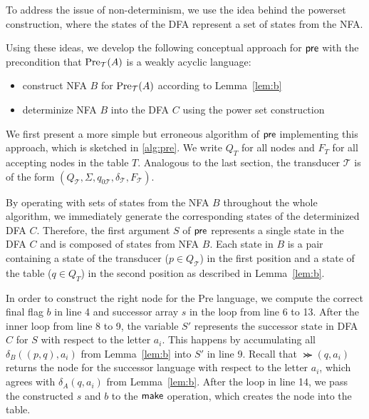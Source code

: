 \par

To address the issue of non-determinism, we use the idea behind the powerset construction, where the states of the DFA represent a set of states from the NFA. 

\par 

Using these ideas, we develop the following conceptual approach for $\operatorname{\textsf{pre}}$ with the precondition that $\operatorname{\text{Pre}}_{\mathcal{T}}(A)$ is a weakly acyclic language:
\begin{itemize}[-,noitemsep]
\item construct NFA $B$ for $\operatorname{\text{Pre}}_{\mathcal{T}}(A)$ according to Lemma~\ref{lem:b}
\item determinize NFA $B$ into the DFA $C$ using the power set construction
\end{itemize}

We first present a more simple but erroneous algorithm of $\operatorname{\textsf{pre}}$ implementing this approach, which is sketched in \autoref{alg:pre}. We write $Q_{T}$ for all nodes and $F_{T}$ for all accepting nodes in the table $T$. Analogous to the last section, the transducer $\mathcal{T}$ is of the form $(Q_{\mathcal{T}},\Sigma,q_{0\mathcal{T}},\delta_{\mathcal{T}},F_{\mathcal{T}})$.

By operating with sets of states from the NFA $B$ throughout the whole algorithm, we immediately generate the corresponding states of the determinized DFA $C$.
Therefore, the first argument $S$ of $\operatorname{\textsf{pre}}$ represents a single state in the DFA $C$ and is composed of states from NFA $B$.  
Each state in $B$ is a pair containing a state of the transducer ($ p \in Q_{\mathcal{T}}$) in the first position and a state of the table ($ q \in Q_{T}$) in the second position as described in Lemma~\autoref{lem:b}.

In order to construct the right node for the Pre language, we compute the correct final flag $b$ in line 4 and successor array $s$ in the loop from line 6 to 13. After the inner loop from line 8 to 9, the variable $S'$ represents the successor state in DFA $C$ for $S$ with respect to the letter $a_{i}$. This happens by accumulating all $\delta_{B}((p,q),a_{i})$ from Lemma~\autoref{lem:b} into $S'$ in line 9. Recall that $\Succ(q,a_{i})$ returns the node for the successor language with respect to the letter $a_{i}$, which agrees with $\delta_{A}(q,a_{i})$ from Lemma~\autoref{lem:b}.
After the loop in line 14, we pass the constructed $s$ and $b$ to the $\operatorname{\textsf{make}}$ operation, which creates the node into the table.




